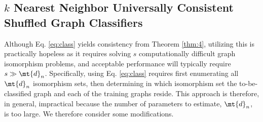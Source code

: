 \documentclass[10pt,journal,cspaper,compsoc]{IEEEtran}
\begin{document}

\subsection{$k$ Nearest Neighbor Universally Consistent Shuffled Graph Classifiers} %
\label{sec:a_practical_approach_to_unlabeled_graph_classification}

Although Eq. \eqref{eq:class} yields consistency from Theorem \ref{thm:4}, utilizing this is practically hopeless as it requires solving $s$ computationally difficult graph isomorphism problems, and acceptable performance will  typically require $s \gg \mt{d}_n$.  Specifically, using Eq. \eqref{eq:class} requires first enumerating  all $\mt{d}_n$ isomorphism sets, then determining in which isomorphism set the to-be-classified graph and each of the training graphs reside.  This approach is therefore, in general, impractical because the number of parameters to estimate, $\mt{d}_n$, is too large. We therefore consider some modifications.
\end{document}
